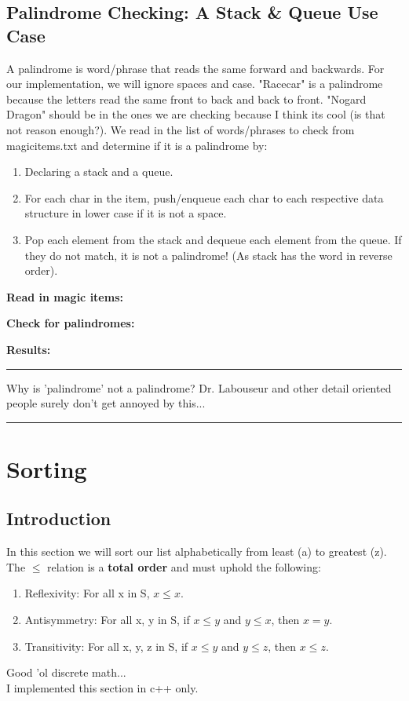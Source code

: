 \documentclass[letterpaper, 10pt]{article}
\begin{document}
\subsection{Palindrome Checking: A Stack \& Queue Use Case}
A palindrome is word/phrase that reads the same forward and backwards. For our implementation, we will ignore spaces and case. "Racecar" is a palindrome because the letters read the same front to back and back to front. "Nogard Dragon" should be in the ones we are checking because I think its cool (is that not reason enough?). We read in the list of words/phrases to check from magicitems.txt and determine if it is a palindrome by: \\
\begin{enumerate}
    \item Declaring a stack and a queue.
    \item For each char in the item, push/enqueue each char to each respective data structure in lower case if it is not a space.
    \item Pop each element from the stack and dequeue each element from the queue. If they do not match, it is not a palindrome! (As stack has the word in reverse order).
\end{enumerate}

\textbf{Read in magic items:}



\textbf{Check for palindromes:}


\textbf{Results:}

\hrule
\vspace{.25cm}
Why is 'palindrome' not a palindrome? Dr. Labouseur and other detail oriented people surely don't get annoyed by this...\\
\hrule

\section{Sorting}
\subsection{Introduction}
In this section we will sort our list alphabetically from least (a) to greatest (z). The $\leq$ 
 relation is a \textbf{total order} and must uphold the following: \\
\begin{enumerate}
    \item Reflexivity: For all x in S, $x \leq x$.
    \item Antisymmetry: For all x, y in S, if $x \leq y$ and $y \leq x$, then $x = y$.
    \item Transitivity: For all x, y, z in S, if $x \leq y$ and $y \leq z$, then $x \leq z$.
\end{enumerate}
\smaller Good 'ol discrete math... \\
\normalsize
I implemented this section in c++ only.
\end{document}
